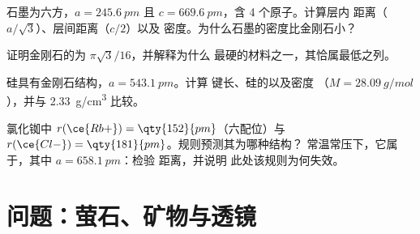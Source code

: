 \begin{exercise}[$\star\star$]\label{exo:b1:crystals-ionic-covalent:9}
石墨为六方，$a = \qty{245.6}{pm}$ 且
$c = \qty{669.6}{pm}$，含 4 个原子。计算层内
 距离（$a/\sqrt3$）、层间距离（$c/2$）以及
密度。为什么石墨的密度比金刚石小？
\end{exercise}

\begin{exercise}[$\star\star\star$]\label{exo:b1:crystals-ionic-covalent:10}
证明金刚石的为 $\pi\sqrt3/16$，并解释为什么
最硬的材料之一，其恰属最低之列。
\end{exercise}

\begin{exercise}[$\star\star\star$]\label{exo:b1:crystals-ionic-covalent:11}
硅具有金刚石结构，$a = \qty{543.1}{pm}$。计算
 键长、硅的以及密度
（$M = \qty{28.09}{g/mol}$），并与 \qty{2.33}{g/cm^3} 比较。
\end{exercise}

\begin{exercise}[$\star\star\star$]\label{exo:b1:crystals-ionic-covalent:12}
氯化铷中 $r(\ce{Rb+}) = \qty{152}{pm}$（六配位）与
$r(\ce{Cl-}) = \qty{181}{pm}$。规则预测其为哪种结构？
常温常压下，它属于，其中
$a = \qty{658.1}{pm}$：检验  距离，并说明
此处该规则为何失效。
\end{exercise}

\section{问题：萤石、矿物与透镜}

